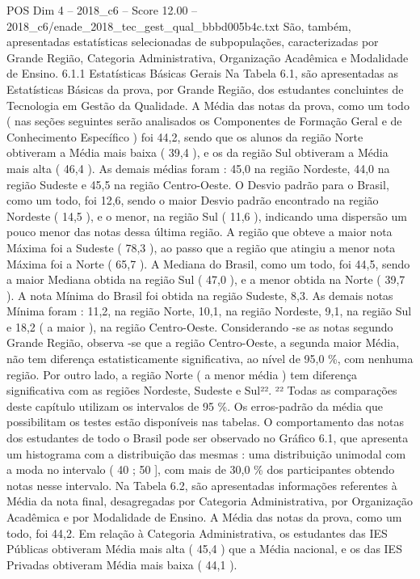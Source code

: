 \begin{textsample}{POS Dim 4 – 2018\_c6 – Score 12.00 – 2018\_c6/enade\_2018\_tec\_gest\_qual\_bbbd005b4c.txt}
São, também, apresentadas estatísticas selecionadas de subpopulações, caracterizadas por Grande Região, Categoria Administrativa, Organização Acadêmica e Modalidade de Ensino. 6.1.1 Estatísticas Básicas Gerais Na Tabela 6.1, são apresentadas as Estatísticas Básicas da prova, por Grande Região, dos estudantes concluintes de Tecnologia em Gestão da Qualidade.
A Média das notas da prova, como um todo ( nas seções seguintes serão analisados os Componentes de Formação Geral e de Conhecimento Específico ) foi 44,2, sendo que os alunos da região Norte obtiveram a Média mais baixa ( 39,4 ), e os da região Sul obtiveram a Média mais alta ( 46,4 ).
As demais médias foram : 45,0 na região Nordeste, 44,0 na região Sudeste e 45,5 na região Centro-Oeste.
O Desvio padrão para o Brasil, como um todo, foi 12,6, sendo o maior Desvio padrão encontrado na região Nordeste ( 14,5 ), e o menor, na região Sul ( 11,6 ), indicando uma dispersão um pouco menor das notas dessa última região.
A região que obteve a maior nota Máxima foi a Sudeste ( 78,3 ), ao passo que a região que atingiu a menor nota Máxima foi a Norte ( 65,7 ).
A Mediana do Brasil, como um todo, foi 44,5, sendo a maior Mediana obtida na região Sul ( 47,0 ), e a menor obtida na Norte ( 39,7 ).
A nota Mínima do Brasil foi obtida na região Sudeste, 8,3.
As demais notas Mínima foram : 11,2, na região Norte, 10,1, na região Nordeste, 9,1, na região Sul e 18,2 ( a maior ), na região Centro-Oeste.
Considerando -se as notas segundo Grande Região, observa -se que a região Centro-Oeste, a segunda maior Média, não tem diferença estatisticamente significativa, ao nível de 95,0 \%, com nenhuma região.
Por outro lado, a região Norte ( a menor média ) tem diferença significativa com as regiões Nordeste, Sudeste e Sul²². ²² Todas as comparações deste capítulo utilizam os intervalos de 95 \%.
Os erros-padrão da média que possibilitam os testes estão disponíveis nas tabelas.
O comportamento das notas dos estudantes de todo o Brasil pode ser observado no Gráfico 6.1, que apresenta um histograma com a distribuição das mesmas : uma distribuição unimodal com a moda no intervalo ( 40 ; 50 ], com mais de 30,0 \% dos participantes obtendo notas nesse intervalo.
Na Tabela 6.2, são apresentadas informações referentes à Média da nota final, desagregadas por Categoria Administrativa, por Organização Acadêmica e por Modalidade de Ensino.
A Média das notas da prova, como um todo, foi 44,2.
Em relação à Categoria Administrativa, os estudantes das IES Públicas obtiveram Média mais alta ( 45,4 ) que a Média nacional, e os das IES Privadas obtiveram Média mais baixa ( 44,1 ).

\end{textsample}
